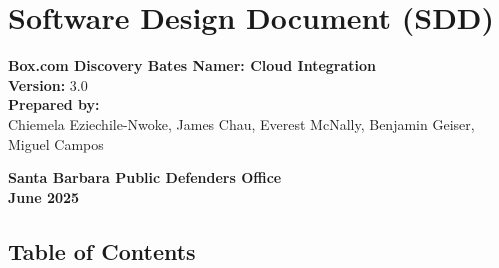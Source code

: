 \documentclass[
]{article}
\author{}
\date{}
\begin{document}
\hypertarget{software-design-document-sdd}{%
\section{\texorpdfstring{\textbf{Software Design Document
(SDD)}}{Software Design Document (SDD)}}\label{software-design-document-sdd}}

\textbf{Box.com Discovery Bates Namer: Cloud Integration}\\
\textbf{Version:} 3.0\\
\textbf{Prepared by:}\\
Chiemela Eziechile-Nwoke, James Chau, Everest McNally, Benjamin Geiser,
Miguel Campos

\textbf{Santa Barbara Public Defender\textquotesingle s Office}\\
\textbf{June 2025}

\hypertarget{table-of-contents}{%
\subsection{\texorpdfstring{\textbf{Table of
Contents}}{Table of Contents}}\label{table-of-contents}}
\end{document}

